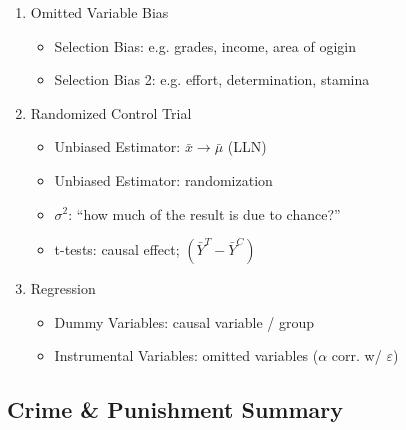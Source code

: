 \documentclass[11pt, english]{article}
\begin{document}
	\begin{enumerate}
	\setlength\itemsep{0cm}
		\item Omitted Variable Bias
		\begin{itemize}
			\item Selection Bias: e.g. grades, income, area of ogigin
			\item Selection Bias 2: e.g. effort, determination, stamina
		\end{itemize}
		\item Randomized Control Trial
		\begin{itemize}
			\item Unbiased Estimator: $\bar{x}\longrightarrow\bar{\mu}$ (LLN)
			\item Unbiased Estimator: randomization
			\item $\sigma^2$: ``how much of the result is due to chance?''
			\item t-tests: causal effect; $(\bar{Y}^T-\bar{Y}^C)$
		\end{itemize}
		\item Regression
		\begin{itemize}
			\item Dummy Variables: causal variable / group
			\item Instrumental Variables: omitted variables ($\alpha$ corr. w/ $\varepsilon$)
		\end{itemize}
	\end{enumerate}

	\newpage

	\subsection{Crime \& Punishment Summary}
\end{document}
